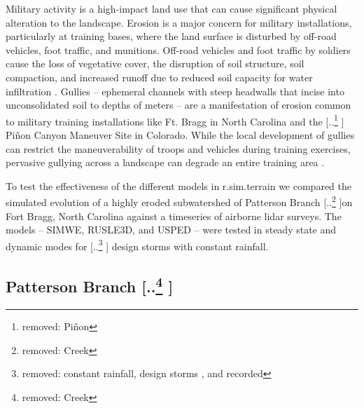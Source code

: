 \documentclass[gmd, manuscript]{copernicus}
\providecommand{\DIFadd}[1]{{\protect\color{blue} \sf #1}} %
\providecommand{\DIFdel}[1]{{\protect\color{red} [..\footnote{removed: #1} ]}} %
\providecommand{\DIFaddbegin}{} %
\providecommand{\DIFaddend}{} %
\providecommand{\DIFdelbegin}{} %
\providecommand{\DIFdelend}{} %
\begin{document}
Military activity is a high-impact land use 
that can cause significant physical alteration to the landscape. 
Erosion is a major concern for military installations, 
particularly at training bases, 
where the land surface is disturbed by 
off-road vehicles, foot traffic, and munitions. 
Off-road vehicles and foot traffic by soldiers 
cause the loss of vegetative cover, 
the disruption of soil structure, soil compaction, 
and increased runoff due to 
reduced soil capacity for water infiltration 
\citep{Webb1983, McDonald2004}.
Gullies -- ephemeral channels with steep headwalls 
that incise into unconsolidated soil to depths of meters -- 
are a manifestation of erosion common to 
military training installations like Ft. Bragg in North Carolina 
and the \DIFdelbegin \DIFdel{Piñon }\DIFdelend \DIFaddbegin \DIFadd{Pi\~{n}on }\DIFaddend Canyon Maneuver Site in Colorado. 
While the local development of gullies can restrict 
the maneuverability of troops and vehicles during training exercises, 
pervasive gullying across a landscape 
can degrade an entire training area 
\citep{Huang2014}.
\DIFdelbegin %

\DIFdelend %
To test the effectiveness of the different models 
in r.sim.terrain
we compared the simulated evolution
of a highly eroded subwatershed 
of Patterson Branch \DIFdelbegin \DIFdel{Creek }\DIFdelend on Fort Bragg, North Carolina
against a timeseries of airborne lidar surveys.
The models -- SIMWE, RUSLE3D, and USPED --
were tested in steady state and dynamic modes
for \DIFdelbegin \DIFdel{constant rainfall, design storms , and recorded }\DIFdelend \DIFaddbegin \DIFadd{design storms with constant }\DIFaddend rainfall.

\subsection{Patterson Branch\DIFdelbegin \DIFdel{Creek}\DIFdelend }
\end{document}
